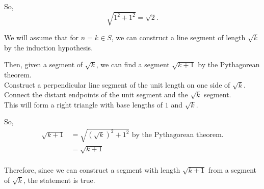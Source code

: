 \documentclass{article}
\begin{document}
So, \[\sqrt{1^2 + 1^2} = \sqrt{2}.\]

We will assume that for $n=k \in S$, we can construct a line segment of length $\sqrt{k}$ by the induction hypothesis.

Then, given a segment of $\sqrt{k}$, we can find a segment $\sqrt{k+1}$ by the Pythagorean theorem.
\\ Construct a perpendicular line segment of the unit length on one side of $\sqrt{k}$.
\\ Connect the distant endpoints of the unit segment and the $\sqrt{k}$ segment.
\\ This will form a right triangle with base lengths of $1$ and $\sqrt{k}$.

So,
\begin{align*}
    \sqrt{k+1} &= \sqrt{{\left( \sqrt{k} \right)}^2 + 1^2} \text{ by the Pythagorean theorem.} \\
    &= \sqrt{k+1} \\
\end{align*}

\begin{figure*}[ht]
\centering
{}
\end{figure*}

Therefore, since we can construct a segment with length $\sqrt{k+1}$ from a segment of $\sqrt{k}$, the statement is true.
\end{document}
